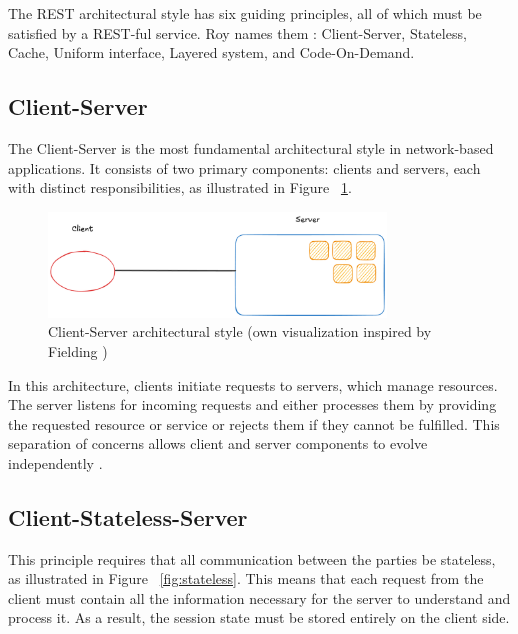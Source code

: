 The REST architectural style has six guiding principles, all of which must be satisfied by a REST-ful service. Roy names them \cite[Chapter 5]{fielding2000}: Client-Server, Stateless, Cache, Uniform interface, Layered system, and Code-On-Demand.

\subsection{Client-Server}

The Client-Server is the most fundamental architectural style in network-based applications. It consists of two primary components: clients and servers, each with distinct responsibilities, as illustrated in Figure ~\ref{fig:client-server}.

\begin{figure}[!h]
\centering
\includegraphics[width=0.8\textwidth, keepaspectratio]{figures/client-server.png}
\caption{Client-Server architectural style (own visualization inspired by Fielding \cite{fielding2000})}
\label{fig:client-server}
\end{figure}

In this architecture, clients initiate requests to servers, which manage resources. The server listens for incoming requests and either processes them by providing the requested resource or service or rejects them if they cannot be fulfilled. This separation of concerns allows client and server components to evolve independently \cite{sinha1992}.

\subsection{Client-Stateless-Server}

This principle requires that all communication between the parties be stateless, as illustrated in Figure ~\ref{fig:stateless}. This means that each request from the client must contain all the information necessary for the server to understand and process it\cite{MESBAH20082194}. As a result, the session state must be stored entirely on the client side.\cite[Section 3.4.1.]{fielding2000}

